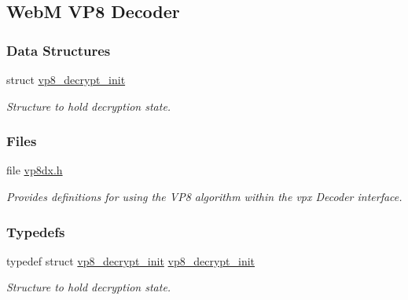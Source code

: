 \hypertarget{group__vp8__decoder}{\subsection{\-Web\-M \-V\-P8 \-Decoder}
\label{group__vp8__decoder}
}
\subsubsection*{\-Data \-Structures}
\begin{DoxyCompactItemize}
\item 
struct \hyperlink{structvp8__decrypt__init}{vp8\-\_\-decrypt\-\_\-init}
\begin{DoxyCompactList}\small\item\em \-Structure to hold decryption state. \end{DoxyCompactList}\end{DoxyCompactItemize}
\subsubsection*{\-Files}
\begin{DoxyCompactItemize}
\item 
file \hyperlink{vp8dx_8h}{vp8dx.\-h}
\begin{DoxyCompactList}\small\item\em \-Provides definitions for using the \-V\-P8 algorithm within the vpx \-Decoder interface. \end{DoxyCompactList}\end{DoxyCompactItemize}
\subsubsection*{\-Typedefs}
\begin{DoxyCompactItemize}
\item 
typedef struct \hyperlink{structvp8__decrypt__init}{vp8\-\_\-decrypt\-\_\-init} \hyperlink{group__vp8__decoder_ga718de6c94c9561b35aa7497f1182758b}{vp8\-\_\-decrypt\-\_\-init}
\begin{DoxyCompactList}\small\item\em \-Structure to hold decryption state. \end{DoxyCompactList}\end{DoxyCompactItemize}
